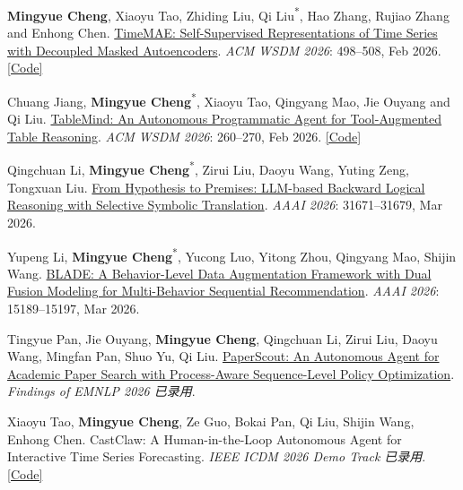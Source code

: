 \documentclass[UTF8,fontset=fandol,scheme=plain,11pt,a4paper]{ctexart}
\newcommand{\pubentry}[1]{\item \begin{minipage}[t]{\linewidth}#1\end{minipage}}
\begin{document}
\begin{publist}[start=4]
\pubentry{\textbf{Mingyue Cheng}, Xiaoyu Tao, Zhiding Liu, Qi Liu\textsuperscript{*}, Hao Zhang, Rujiao Zhang and Enhong Chen. \href{https://arxiv.org/abs/2303.00320}{TimeMAE: Self-Supervised Representations of Time Series with Decoupled Masked Autoencoders}. \emph{ACM WSDM 2026}: 498--508, Feb 2026. \href{https://github.com/Mingyue-Cheng/TimeMAE}{[Code]}}

\pubentry{Chuang Jiang, \textbf{Mingyue Cheng}\textsuperscript{*}, Xiaoyu Tao, Qingyang Mao, Jie Ouyang and Qi Liu. \href{https://arxiv.org/pdf/2509.06278}{TableMind: An Autonomous Programmatic Agent for Tool-Augmented Table Reasoning}. \emph{ACM WSDM 2026}: 260--270, Feb 2026. \href{https://github.com/lennendd/TableMind-Repo}{[Code]}}

\pubentry{Qingchuan Li, \textbf{Mingyue Cheng}\textsuperscript{*}, Zirui Liu, Daoyu Wang, Yuting Zeng, Tongxuan Liu. \href{https://ojs.aaai.org/index.php/AAAI/article/download/40434/44395}{From Hypothesis to Premises: LLM-based Backward Logical Reasoning with Selective Symbolic Translation}. \emph{AAAI 2026}: 31671--31679, Mar 2026.}

\pubentry{Yupeng Li, \textbf{Mingyue Cheng}\textsuperscript{*}, Yucong Luo, Yitong Zhou, Qingyang Mao, Shijin Wang. \href{https://ojs.aaai.org/index.php/AAAI/article/download/38543/42505}{BLADE: A Behavior-Level Data Augmentation Framework with Dual Fusion Modeling for Multi-Behavior Sequential Recommendation}. \emph{AAAI 2026}: 15189--15197, Mar 2026.}

\pubentry{Tingyue Pan, Jie Ouyang, \textbf{Mingyue Cheng}, Qingchuan Li, Zirui Liu, Daoyu Wang, Mingfan Pan, Shuo Yu, Qi Liu. \href{https://arxiv.org/pdf/2601.10029.pdf}{PaperScout: An Autonomous Agent for Academic Paper Search with Process-Aware Sequence-Level Policy Optimization}. \emph{Findings of EMNLP 2026 已录用}.}

\pubentry{Xiaoyu Tao, \textbf{Mingyue Cheng}, Ze Guo, Bokai Pan, Qi Liu, Shijin Wang, Enhong Chen. CastClaw: A Human-in-the-Loop Autonomous Agent for Interactive Time Series Forecasting. \emph{IEEE ICDM 2026 Demo Track 已录用}. \href{https://github.com/ustc-time-series/CastClaw}{[Code]}}


\end{publist}
\end{document}
